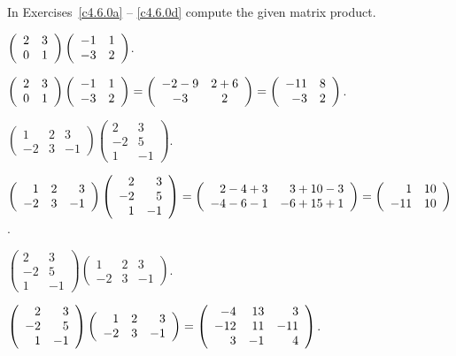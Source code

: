 \documentclass{ximera}
\begin{document}
\noindent In Exercises~\ref{c4.6.0a} -- \ref{c4.6.0d} compute
the given matrix product.
\begin{exercise}  \label{c4.6.0a}
$\left(\begin{array}{rr} 2 & 3\\ 0 &1\end{array}\right)\left(\begin{array}{rr} -1 & 1\\ -3 &2\end{array}\right)$.

\begin{solution}

$\left(\begin{array}{rr} 2 & 3\\ 0 &1\end{array}\right)\left(\begin{array}{rr} -1 & 1\\ -3 &2\end{array}\right) =
\left(\begin{array}{cc} -2 - 9 & 2+6\\ -3 &2\end{array}\right) = \left(\begin{array}{rr} -11 & 8\\ -3 &2\end{array}\right)$.

\end{solution}
\end{exercise}
\begin{exercise}  \label{c4.6.0b}
$\left(\begin{array}{rrr} 1 & 2 & 3\\ -2 & 3 & -1 \end{array}\right)
\left(\begin{array}{rr} 2 & 3\\ -2 & 5 \\1 & -1 \end{array}\right)$.

\begin{solution}

$\left(\begin{array}{rrr} 1 & 2 & 3\\ -2 & 3 & -1 \end{array}\right)
\left(\begin{array}{rr} 2 & 3\\ -2 & 5 \\1 & -1 \end{array}\right)
= \left(\begin{array}{rr} 2 - 4 + 3 & 3 + 10 - 3\\ -4 - 6 - 1 &-6 + 15 + 1\end{array}\right)
= \left(\begin{array}{rr} 1 & 10\\ -11 &10\end{array}\right)$.

\end{solution}
\end{exercise}
\begin{exercise}  \label{c4.6.0c}
$\left(\begin{array}{rr} 2 & 3\\ -2 & 5 \\1 & -1 \end{array}\right)
\left(\begin{array}{rrr} 1 & 2 & 3\\ -2 & 3 & -1 \end{array}\right)$.

\begin{solution}
$\left(\begin{array}{rr} 2 & 3\\ -2 & 5 \\1 & -1 \end{array}
\right) \left(\begin{array}{rrr} 1 & 2 & 3\\ -2 & 3 & -1 \end{array}\right)
= \left(\begin{array}{rrr} -4 & 13 & 3 \\ -12 & 11 & -11 \\ 3 & -1 & 4\end{array}\right)$.

\end{solution}
\end{exercise}
\end{document}

